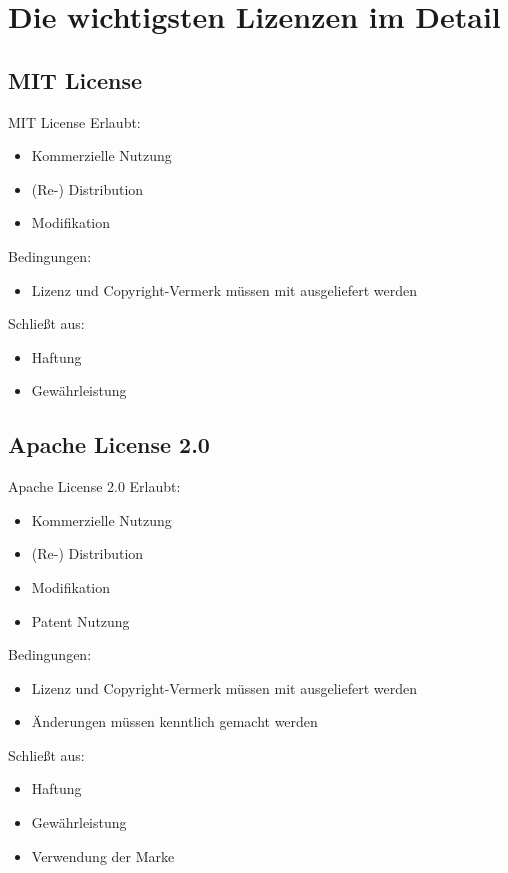 \documentclass{beamer}
\begin{document}
\section{Die wichtigsten Lizenzen im Detail}
\subsection{MIT License}
\begin{frame}{MIT License}
	Erlaubt:
	\begin{itemize}
		\item Kommerzielle Nutzung
		\item (Re-) Distribution
		\item Modifikation
	\end{itemize}

	Bedingungen:
	\begin{itemize}
		\item Lizenz und Copyright-Vermerk müssen mit ausgeliefert werden
	\end{itemize}

	Schließt aus:
	\begin{itemize}
		\item Haftung
		\item Gewährleistung
	\end{itemize}
\end{frame}

\subsection{Apache License 2.0}
\begin{frame}{Apache License 2.0}
	Erlaubt:
	\begin{itemize}
		\item Kommerzielle Nutzung
		\item (Re-) Distribution
		\item Modifikation
		\item Patent Nutzung
	\end{itemize}

	Bedingungen:
	\begin{itemize}
		\item Lizenz und Copyright-Vermerk müssen mit ausgeliefert werden
		\item Änderungen müssen kenntlich gemacht werden
	\end{itemize}

	Schließt aus:
	\begin{itemize}
		\item Haftung
		\item Gewährleistung
		\item Verwendung der Marke
	\end{itemize}
\end{frame}
\end{document}
